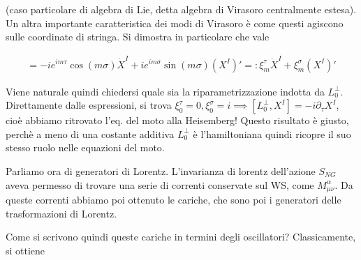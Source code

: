 \documentclass{report}
\begin{document}
(caso particolare di algebra di Lie, detta algebra di Virasoro centralmente estesa). Un altra importante caratteristica dei modi di Virasoro è come questi agiscono sulle coordinate di stringa. Si dimostra in particolare che vale 

\begin{align}
    [L_m^\perp, X^I(\sigma, \tau)] = -ie^{im\tau}\cos(m\sigma)\dot{X}^I + ie^{im\sigma}\sin(m\sigma)(X^I)' =: \xi_m^\tau \dot{X}^I + \xi_m^\sigma (X^I)'
\end{align}



Viene naturale quindi chiedersi quale sia la riparametrizzazione indotta da \(L_0^\perp\). Direttamente dalle espressioni, si trova \(\xi^\tau_0 = 0, \xi^\sigma_0 = i \implies [L_0^\perp, X^I] = -i\partial_\tau X^I\), cioè abbiamo ritrovato l'eq. del moto alla Heisemberg! Questo risultato è giusto, perchè a meno di una costante additiva \(L_0^\perp\) è l'hamiltoniana quindi ricopre il suo stesso ruolo nelle equazioni del moto. 

Parliamo ora di generatori di Lorentz. L'invarianza di lorentz dell'azione \(S_{NG}\) aveva permesso di trovare una serie di correnti conservate sul WS, come \(M^\alpha_{\mu\nu}\). Da queste correnti abbiamo poi ottenuto le cariche, che sono poi i generatori delle trasformazioni di Lorentz. 

Come si scrivono quindi queste cariche in termini degli oscillatori? Classicamente, si ottiene 
\end{document}
